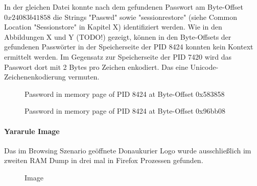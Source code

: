 In der gleichen Datei konnte nach dem gefundenen Passwort am Byte-Offset $0x24083b41858$ die Strings "Passwd" sowie "sessionrestore" (siehe Common Location "Sessionstore" in Kapitel X) identifiziert werden. 
Wie in den Abbildungen X und Y (TODO!) gezeigt, können in den Byte-Offsets der gefundenen Passwörter in der Speicherseite der PID 8424 konnten kein Kontext ermittelt werden. Im Gegensatz zur Speicherseite der PID 7420 wird das Passwort dort mit 2 Bytes pro Zeichen enkodiert. Das eine Unicode-Zeichenenkodierung vermuten.
\begin{figure}[h!]
	\centerline{}
	\label{chart:final-criteria}  
	\caption{Password in memory page of PID 8424 at Byte-Offset 0x583858}
\end{figure}
\begin{figure}[h!]
\centerline{}
\label{chart:final-criteria}  
\caption{Password in memory page of PID 8424 at Byte-Offset 0x96bb08}
\end{figure}
				
\paragraph*{Yararule Image}
Das im Browsing Szenario geöffnete Donaukurier Logo wurde ausschließlich im zweiten RAM Dump in drei mal in Firefox Prozessen gefunden.
\begin{figure}[h!]
	\centerline{}
	\label{chart:final-criteria}  
	\caption{Image}
\end{figure}

